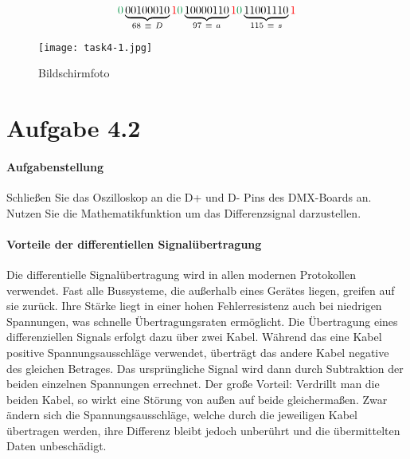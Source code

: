 $$
	\textcolor{ForestGreen}{0}\underbrace{00100010}_{68 \ \equiv \ D}\textcolor{red}{1}
	\textcolor{ForestGreen}{0}\underbrace{10000110}_{97 \ \equiv \ a}\textcolor{red}{1}
	\textcolor{ForestGreen}{0}\underbrace{11001110}_{115 \ \equiv \ s}\textcolor{red}{1}
$$

\begin{figure}[h!]
	\centering
	\texttt{[image: task4-1.jpg]}
	\caption{Bildschirmfoto}
	\label{task4-1}
\end{figure}

\section{Aufgabe 4.2}
\paragraph{Aufgabenstellung}
Schließen Sie das Oszilloskop an die D+ und D- Pins des DMX-Boards an. Nutzen Sie die Mathematikfunktion um das Differenzsignal darzustellen.

\paragraph{Vorteile der differentiellen Signalübertragung}
Die differentielle Signalübertragung wird in allen modernen Protokollen verwendet. Fast alle Bussysteme, die außerhalb eines Gerätes liegen, greifen auf sie zurück. Ihre Stärke liegt in einer hohen Fehlerresistenz auch bei niedrigen Spannungen, was schnelle Übertragungsraten ermöglicht. Die Übertragung eines differenziellen Signals erfolgt dazu über zwei Kabel. Während das eine Kabel positive Spannungsausschläge verwendet, überträgt das andere Kabel negative des gleichen Betrages. Das ursprüngliche Signal wird dann durch Subtraktion der beiden einzelnen Spannungen errechnet. Der große Vorteil: Verdrillt man die beiden Kabel, so wirkt eine Störung von außen auf beide gleichermaßen. Zwar ändern sich die Spannungsausschläge, welche durch die jeweiligen Kabel übertragen werden, ihre Differenz bleibt jedoch unberührt und die übermittelten Daten unbeschädigt.

